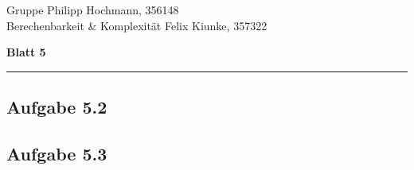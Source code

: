 \documentclass[a4paper,graphics,11pt]{article}
\newcommand\aufgabe[1]{\subsection*{Aufgabe #1}}
\begin{document}
\noindent Gruppe              \hfill Philipp Hochmann, 356148 \\
\noindent Berechenbarkeit \& Komplexität \hfill Felix Kiunke, 357322 \\

\begin{center}
	\LARGE{\textbf{Blatt 5}}
\end{center}
\begin{center}
\rule[0.1ex]{\textwidth}{1pt}
\end{center}

\aufgabe{5.2}

\aufgabe{5.3}

\end{document}

